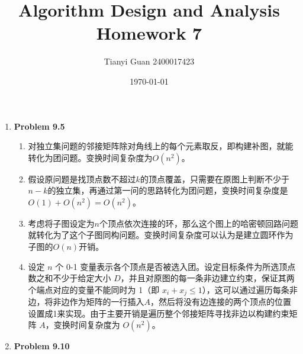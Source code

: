\documentclass{ctexart}
\title{\vspace*{-1cm}Algorithm Design and Analysis Homework 7}
\author{Tianyi Guan 2400017423}
\date{\today}
\begin{document}
\maketitle
\begin{enumerate}[label=\arabic*.]
    \item \textbf{Problem 9.5}
        \begin{enumerate}[label=(\arabic*)]
            \item 对独立集问题的邻接矩阵除对角线上的每个元素取反，即构建补图，就能转化为团问题。变换时间复杂度为$O(n^2)$。
            \item 假设原问题是找顶点数不超过$k$的顶点覆盖，只需要在原图上判断不少于$n-k$的独立集，再通过第一问的思路转化为团问题，变换时间复杂度是$O(1)+O(n^2)=O(n^2)$。
            \item 考虑将子图设定为$n$个顶点依次连接的环，那么这个图上的哈密顿回路问题就转化为了这个子图同构问题。变换时间复杂度可以认为是建立圆环作为子图的$O(n)$开销。
            \item 设定 $n$ 个 0-1 变量表示各个顶点是否被选入团。设定目标条件为所选顶点数之和不少于给定大小 $D$，并且对原图的每一条非边建立约束，保证其两个端点对应的变量不能同时为 1（即 $x_i + x_j \le 1$），这可以通过遍历每条非边，将非边作为矩阵的一行插入$A$，然后将没有边连接的两个顶点的位置设置成1来实现。由于主要开销是遍历整个邻接矩阵寻找非边以构建约束矩阵 $A$，变换时间复杂度为 $O(n^2)$。
        \end{enumerate}
    \item \textbf{Problem 9.10}
    

\end{enumerate}
\end{document}
